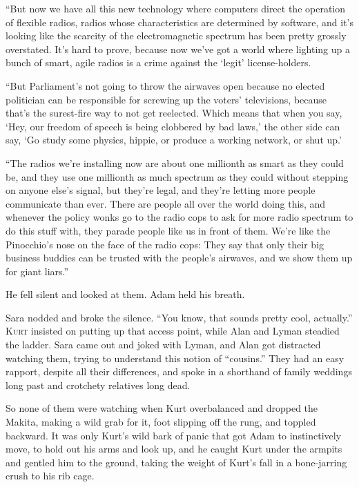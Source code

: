 ``But now we have all this new technology where computers direct the
operation of flexible radios, radios whose characteristics are
determined by software, and it's looking like the scarcity of the
electromagnetic spectrum has been pretty grossly overstated.  It's
hard to prove, because now we've got a world where lighting up a bunch
of smart, agile radios is a crime against the `legit' license-holders.

``But Parliament's not going to throw the airwaves open because no
elected politician can be responsible for screwing up the voters'
televisions, because that's the surest-fire way to not get reelected. 
Which means that when you say, `Hey, our freedom of speech is being
clobbered by bad laws,' the other side can say, `Go study some
physics, hippie, or produce a working network, or shut up.'

``The radios we're installing now are about one millionth as smart as
they could be, and they use one millionth as much spectrum as they
could without stepping on anyone else's signal, but they're legal, and
they're letting more people communicate than ever.  There are people
all over the world doing this, and whenever the policy wonks go to the
radio cops to ask for more radio spectrum to do this stuff with, they
parade people like us in front of them.  We're like the Pinocchio's
nose on the face of the radio cops:  They say that only their big
business buddies can be trusted with the people's airwaves, and we
show them up for giant liars.''

He fell silent and looked at them.  Adam held his breath.

Sara nodded and broke the silence.  ``You know, that sounds pretty
cool, actually.''
\\
\lettrine[lines=3, lhang=.5, nindent=0pt, findent=2pt]{K}{urt} insisted on putting up that access point, while Alan and Lyman
steadied the ladder.  Sara came out and joked with Lyman, and Alan got
distracted watching them, trying to understand this notion of
``cousins.'' They had an easy rapport, despite all their differences,
and spoke in a shorthand of family weddings long past and crotchety
relatives long dead.

So none of them were watching when Kurt overbalanced and dropped the
Makita, making a wild grab for it, foot slipping off the rung, and
toppled backward.  It was only Kurt's wild bark of panic that got Adam
to instinctively move, to hold out his arms and look up, and he caught
Kurt under the armpits and gentled him to the ground, taking the
weight of Kurt's fall in a bone-jarring crush to his rib cage.


